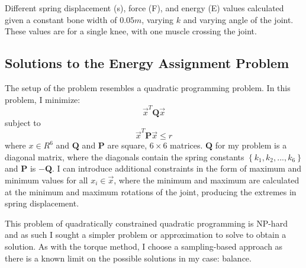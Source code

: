 \begin{table}[ht]
	\centering
	\caption[Table of estimated forces given $k$ values and joint angles]{Different spring displacement (s), force (F), and energy (E) values calculated given a constant bone width of $0.05m$, varying $k$ and varying angle of the joint.  These values are for a single knee, with one muscle crossing the joint.}
	\label{tab:force_est}
	
\end{table}


\subsection{Solutions to the Energy Assignment Problem}
\label{subsection:energy_prob}
The setup of the problem resembles a quadratic programming problem.  In this problem, I minimize: \[ \vec{x}^T \mathbf{Q} \vec{x} \] subject to
\[ \vec{x}^T \mathbf{P} \vec{x} \le r \] where $x \in R^6$ and $\mathbf{Q}$ and $\mathbf{P}$ are square, $6 \times 6$ matrices.  $\mathbf{Q}$ for my problem is a diagonal matrix, where the diagonals contain the spring constants $\left\lbrace k_1, k_2, ... , k_6 \right\rbrace$ and $\mathbf{P}$ is $- \mathbf{Q}$.  I can introduce additional constraints in the form of maximum and minimum values for all $x_i \in \vec{x}$, where the minimum and maximum are calculated at the minimum and maximum rotations of the joint, producing the extremes in spring displacement.

This problem of quadratically constrained quadratic programming is NP-hard and as such I sought a simpler problem or approximation to solve to obtain a solution.  As with the torque method, I choose a sampling-based approach as there is a known limit on the possible solutions in my case: balance.  

